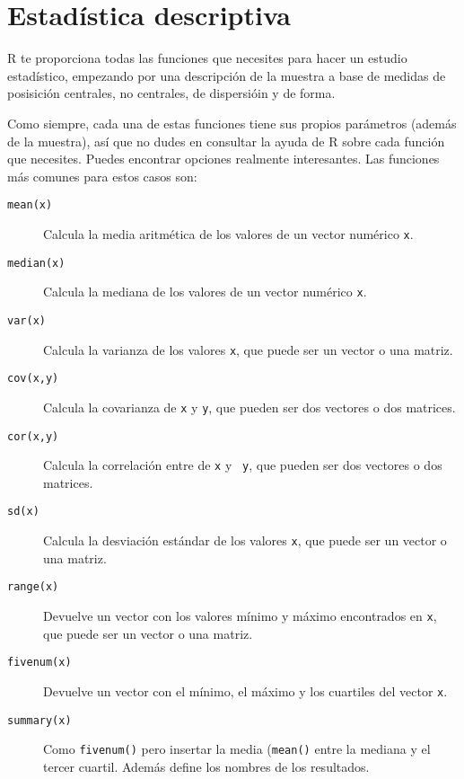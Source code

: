 \section{Estadística descriptiva}


{\sf R} te proporciona todas las funciones que necesites para hacer un
estudio estadístico,  empezando por  una descripción  de la  muestra a
base de medidas de posisición  centrales, no centrales, de dispersióin
y  de forma.

Como siempre, cada una de estas funciones tiene sus propios parámetros
(además de la muestra), así que no dudes en consultar la ayuda de {\sf
R}  sobre  cada  función  que  necesites.  Puedes  encontrar  opciones
realmente  interesantes. Las  funciones más  comunes para  estos casos
son:

\begin{description}

\item[{\tt mean(x)}] Calcula la media  aritmética de los valores de un
vector numérico {\tt x}. 

\item[{\tt median(x)}] Calcula la mediana  de los valores de un vector
numérico {\tt x}.

\item[{\tt var(x)}]  Calcula la varianza  de los valores {\tt  x}, que
puede ser un vector  o una matriz. 

\item[{\tt   cov(x,y)}]   Calcula  la   covarianza   de   {\tt  x}   y
{\tt   y},   que   pueden   ser   dos   vectores   o   dos   matrices.

\item[{\tt cor(x,y)}] Calcula  la correlación entre de {\tt  x} y {\tt
y}, que pueden ser dos vectores o dos matrices.

\item[{\tt   sd(x)}]   Calcula   la   desviación   estándar   de   los
valores   {\tt  x},   que  puede   ser   un  vector   o  una   matriz.

\item[{\tt  range(x)}] Devuelve  un vector  con los  valores mínimo  y
máximo encontrados en  {\tt x}, que puede ser un  vector o una matriz.

\item[{\tt fivenum(x)}] Devuelve un vector  con el mínimo, el máximo y
los cuartiles del vector {\tt x}.

\item[{\tt summary(x)}]  Como {\tt  fivenum()} pero insertar  la media
({\tt mean()} entre la mediana y  el tercer cuartil. Además define los
nombres de los resultados.

\end{description}

